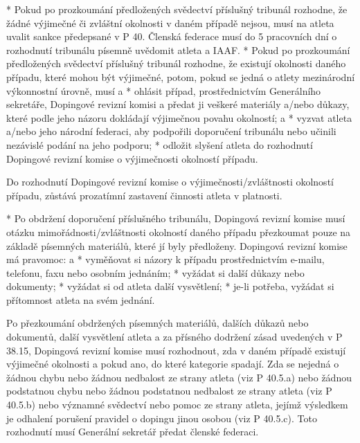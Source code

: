 * Pokud po prozkoumání předložených svědectví příslušný tribunál rozhodne, že žádné výjimečné či zvláštní okolnosti v daném případě nejsou, musí na atleta uvalit sankce předepsané v P 40. Členská federace musí do 5 pracovních dní o rozhodnutí tribunálu písemně uvědomit atleta a IAAF.
* Pokud po prozkoumání předložených svědectví příslušný tribunál rozhodne, že existují okolnosti daného případu, které mohou být výjimečné, potom, pokud se jedná o atlety mezinárodní výkonnostní úrovně, musí
  \begitems \style a
  * ohlásit případ, prostřednictvím Generálního sekretáře, Dopingové revizní komisi a předat ji veškeré materiály a/nebo důkazy, které podle jeho názoru dokládají výjimečnou povahu okolností; a
  * vyzvat atleta a/nebo jeho národní federaci, aby podpořili doporučení tribunálu nebo učinili nezávislé podání na jeho podporu;
  * odložit slyšení atleta do rozhodnutí Dopingové revizní komise o výjimečnosti okolností případu.
  \enditems

Do rozhodnutí Dopingové revizní komise o výjimečnosti/zvláštnosti okolností případu, zůstává prozatímní zastavení činnosti atleta v platnosti.

* Po obdržení doporučení příslušného tribunálu, Dopingová revizní komise musí otázku mimořádnosti/zvláštnosti okolností daného případu přezkoumat pouze na základě písemných materiálů, které jí byly předloženy. Dopingová revizní komise má pravomoc:
  \begitems \style a
  * vyměňovat si názory k případu prostřednictvím e-mailu, telefonu, faxu nebo osobním jednáním;
  * vyžádat si další důkazy nebo dokumenty;
  * vyžádat si od atleta další vysvětlení;
  * je-li potřeba, vyžádat si přítomnost atleta na svém jednání.
  \enditems

Po přezkoumání obdržených písemných materiálů, dalších důkazů nebo dokumentů, další vysvětlení atleta a za přísného dodržení zásad uvedených v P 38.15, Dopingová revizní komise musí rozhodnout, zda v daném případě existují výjimečné okolnosti a pokud ano, do které kategorie spadají. Zda se nejedná o žádnou chybu nebo žádnou nedbalost ze strany atleta (viz P 40.5.a) nebo žádnou podstatnou chybu nebo žádnou podstatnou nedbalost ze strany atleta (viz P 40.5.b) nebo významné svědectví nebo pomoc ze strany atleta, jejímž výsledkem je odhalení porušení pravidel o dopingu jinou osobou (viz P 40.5.c). Toto rozhodnutí musí Generální sekretář předat členské federaci.

